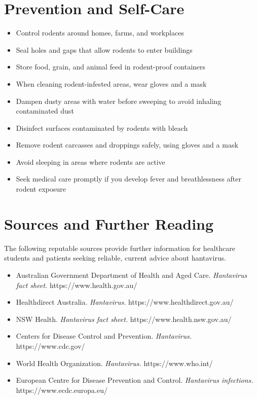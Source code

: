 \section*{Prevention and Self-Care}
\begin{itemize}
    \item Control rodents around homes, farms, and workplaces
    \item Seal holes and gaps that allow rodents to enter buildings
    \item Store food, grain, and animal feed in rodent-proof containers
    \item When cleaning rodent-infested areas, wear gloves and a mask
    \item Dampen dusty areas with water before sweeping to avoid inhaling contaminated dust
    \item Disinfect surfaces contaminated by rodents with bleach
    \item Remove rodent carcasses and droppings safely, using gloves and a mask
    \item Avoid sleeping in areas where rodents are active
    \item Seek medical care promptly if you develop fever and breathlessness after rodent exposure
\end{itemize}

\section*{Sources and Further Reading}
The following reputable sources provide further information for healthcare students and patients seeking reliable, current advice about hantavirus.

\begin{itemize}
    \item Australian Government Department of Health and Aged Care. \textit{Hantavirus fact sheet.} https://www.health.gov.au/
    \item Healthdirect Australia. \textit{Hantavirus.} https://www.healthdirect.gov.au/
    \item NSW Health. \textit{Hantavirus fact sheet.} https://www.health.nsw.gov.au/
    \item Centers for Disease Control and Prevention. \textit{Hantavirus.} https://www.cdc.gov/
    \item World Health Organization. \textit{Hantavirus.} https://www.who.int/
    \item European Centre for Disease Prevention and Control. \textit{Hantavirus infections.} https://www.ecdc.europa.eu/
\end{itemize}
